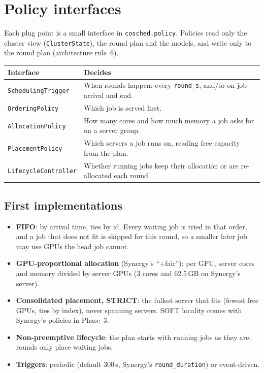 \documentclass[11pt,a4paper]{article}
\newcommand{\code}[1]{\texttt{#1}}
\begin{document}
\section{Policy interfaces}

Each plug point is a small interface in \code{cosched.policy}. Policies read only the cluster view
(\code{ClusterState}), the round plan and the models, and write only to the round plan
(architecture rule~6).

\begin{center}
\begin{tabularx}{\linewidth}{@{}lX@{}}
\toprule
Interface & Decides \\
\midrule
\code{SchedulingTrigger} & When rounds happen: every \code{round\_s}, and/or on job arrival and end. \\
\code{OrderingPolicy} & Which job is served first. \\
\code{AllocationPolicy} & How many cores and how much memory a job asks for on a server group. \\
\code{PlacementPolicy} & Which servers a job runs on, reading free capacity from the plan. \\
\code{LifecycleController} & Whether running jobs keep their allocation or are re-allocated each round. \\
\bottomrule
\end{tabularx}
\end{center}

\subsection{First implementations}
\begin{itemize}
  \item \textbf{FIFO}: by arrival time, ties by id. Every waiting job is tried in that order, and a job
        that does not fit is skipped for this round, so a smaller later job may use GPUs the head job
        cannot.
  \item \textbf{GPU-proportional allocation} (Synergy's ``+fair''): per GPU, server cores and memory
        divided by server GPUs (3 cores and 62.5\,GB on Synergy's server).
  \item \textbf{Consolidated placement, STRICT}: the fullest server that fits (fewest free GPUs, ties
        by index), never spanning servers. SOFT locality comes with Synergy's policies in Phase~3.
  \item \textbf{Non-preemptive lifecycle}: the plan starts with running jobs as they are; rounds only
        place waiting jobs.
  \item \textbf{Triggers}: periodic (default 300\,s, Synergy's \code{round\_duration}) or event-driven.
\end{itemize}
\end{document}
